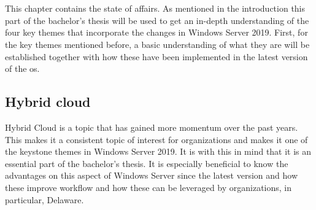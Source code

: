 \chapter{}
\label{ch:stand-van-zaken}


This chapter contains the state of affairs. As mentioned in the introduction this part of the bachelor's thesis will be used to get an in-depth understanding of the four key themes that incorporate the changes in Windows Server 2019. First, for the key themes mentioned before, a basic understanding of what they are will be established together with how these have been implemented in the latest version of the \acrshort{os}.


\section{Hybrid cloud}

Hybrid Cloud is a topic that has gained more momentum over the past years. This makes it a consistent topic of interest for organizations and makes it one of the keystone themes in Windows Server 2019. \autocite{MWST2018} It is with this in mind that it is an essential part of the bachelor's thesis. It is especially beneficial to know the advantages on this aspect of Windows Server since the latest version and how these improve workflow and how these can be leveraged by organizations, in particular, Delaware.

